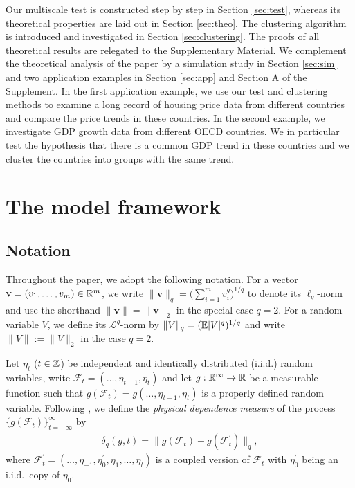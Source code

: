 \documentclass[12pt]{article}
\begin{document}
Our multiscale test is constructed step by step in Section \ref{sec:test}, whereas its theoretical properties are laid out in Section \ref{sec:theo}. The clustering algorithm is introduced and investigated in Section \ref{sec:clustering}. The proofs of all theoretical results are relegated to the Supplementary Material. We complement the theoretical analysis of the paper by a simulation study in Section \ref{sec:sim} and two application examples in Section \ref{sec:app} and Section A of the Supplement. In the first application example, we use our test and clustering methods to examine a long record of housing price data from different countries and compare the price trends in these countries. In the second example, we investigate GDP growth data from different OECD countries. We in particular test the hypothesis that there is a common GDP trend in these countries and we cluster the countries into groups with the same trend. 



\section{The model framework}\label{sec:model}


\subsection{Notation}


Throughout the paper, we adopt the following notation. For a vector $\mathbf{v} = (v_1, \ldots, v_m)\in\mathbb{R}^m$, we write $\|\mathbf{v}\|_q = \big(\sum_{i=1}^m v_i^q\big)^{1/q}$ to denote its $\ell_q$-norm and use the shorthand $\|\mathbf{v}\| = \|\mathbf{v}\|_2$ in the special case $q = 2$. For a random variable $V$, we define its $\mathcal{L}^q$-norm by $\|V\|_q = (\mathbb{E} |V|^q)^{1/q}$ and write $\|V\| := \|V\|_2$ in the case $q = 2$.


Let $\eta_t$ ($t \in \mathbb{Z}$) be independent and identically distributed ($\text{i.i.d.}$) random variables, write $\mathcal{F}_t  = (\ldots, \eta_{t-1}, \eta_t)$ and let $g: \mathbb{R}^\infty \to \mathbb{R}$ be a measurable function such that $g(\mathcal{F}_t) = g(\ldots, \eta_{t-1}, \eta_t)$ is a properly defined random variable. Following \cite{Wu2005}, we define the \textit{physical dependence measure} of the process $\{g(\mathcal{F}_t)\}_{t=-\infty}^\infty$ by
\begin{align}\label{eq:physical_dep}
\delta_q(g, t) = \| g(\mathcal{F}_t) - g(\mathcal{F}_t^\prime) \|_q,
\end{align}
where $\mathcal{F}_t^\prime  = (\ldots, \eta_{-1}, \eta^\prime_0, \eta_1, \ldots, \eta_t)$ is a coupled version of $\mathcal{F}_t$ with $\eta_0^\prime$ being an i.i.d.\ copy of $\eta_0$. 
\end{document}
